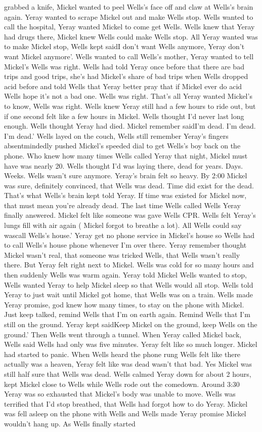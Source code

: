 \documentclass[12pt]{book}
\begin{document}
grabbed a knife, Mickel wanted to peel Wells's face off and claw at Wells's brain again. Yeray wanted to scrape Mickel out and make Wells stop. Wells wanted to call the hospital, Yeray wanted Mickel to come get Wells. Wells knew that Yeray had drugs there, Mickel knew Wells could make Wells stop. All Yeray wanted was to make Mickel stop, Wells kept saidI don't want Wells anymore, Yeray don't want Mickel anymore'. Wells wanted to call Wells's mother, Yeray wanted to tell Mickel's Wells was right. Wells had told Yeray once before that there are bad trips and good trips, she's had Mickel's share of bad trips when Wells dropped acid before and told Wells that Yeray better pray that if Mickel ever do acid Wells hope it's not a bad one. Wells was right. That's all Yeray wanted Mickel's to know, Wells was right. Wells knew Yeray still had a few hours to ride out, but if one second felt like a few hours in Mickel. Wells thought I'd never last long enough. Wells thought Yeray had died. Mickel remember saidI'm dead. I'm dead. I'm dead.' Wells layed on the couch, Wells still remember Yeray's fingers absentmindedly pushed Mickel's speeded dial to get Wells's boy back on the phone. Who knew how many times Wells called Yeray that night, Mickel must have was nearly 20. Wells thought I'd was laying there, dead for years. Days. Weeks. Wells wasn't sure anymore. Yeray's brain felt so heavy. By 2:00 Mickel was sure, definitely convinced, that Wells was dead. Time did exist for the dead. That's what Wells's brain kept told Yeray. If time was existed for Mickel now, that must mean you're already dead. The last time Wells called Wells Yeray finally answered. Mickel felt like someone was gave Wells CPR. Wells felt Yeray's lungs fill with air again ( Mickel forgot to breathe a lot). All Wells could say wascall Wells's house.' Yeray get no phone service in Mickel's house so Wells had to call Wells's house phone whenever I'm over there. Yeray remember thought Mickel wasn't real, that someone was tricked Wells, that Wells wasn't really there. But Yeray felt right next to Mickel. Wells was cold for so many hours and then suddenly Wells was warm again. Yeray told Mickel Wells wanted to stop, Wells wanted Yeray to help Mickel sleep so that Wells would all stop. Wells told Yeray to just wait until Mickel got home, that Wells was on a train. Wells made Yeray promise, god knew how many times, to stay on the phone with Mickel. Just keep talked, remind Wells that I'm on earth again. Remind Wells that I'm still on the ground. Yeray kept saidKeep Mickel on the ground, keep Wells on the ground.' Then Wells went through a tunnel. When Yeray called Mickel back, Wells said Wells had only was five minutes. Yeray felt like so much longer. Mickel had started to panic. When Wells heard the phone rung Wells felt like there actually was a heaven, Yeray felt like was dead wasn't that bad. Yes Mickel was still half sure that Wells was dead. Wells calmed Yeray down for about 2 hours, kept Mickel close to Wells while Wells rode out the comedown. Around 3:30 Yeray was so exhausted that Mickel's body was unable to move. Wells was terrified that I'd stop breathed, that Wells had forgot how to do Yeray. Mickel was fell asleep on the phone with Wells and Wells made Yeray promise Mickel wouldn't hang up. As Wells finally started 
\end{document}
